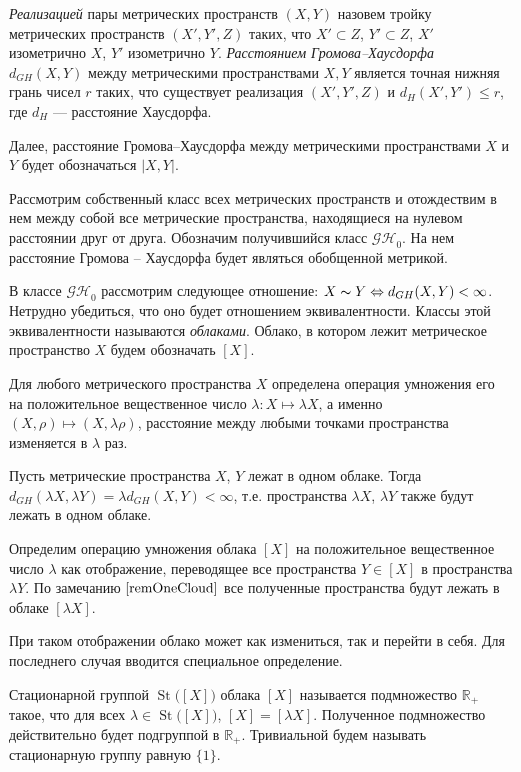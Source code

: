 \documentclass[11pt,twoside,draft
]{article}
\DeclareMathOperator{\St}{St}
\begin{document}
\begin{defin}
  \emph{Реализацией} пары метрических пространств $(X,Y)$ назовем тройку
  метрических пространств $(X',Y',Z)$ таких, что $X' \subset Z$, $Y' \subset Z$,
  $X'$ изометрично $X$, $Y'$ изометрично $Y$. \emph{Расстоянием
  Громова--Хаусдорфа}
  $d_{GH}(X,Y)$ между метрическими пространствами $X, Y$ является точная нижняя
  грань чисел $r$ таких, что существует реализация $(X',Y',Z)$ и $d_H(X', Y')
  \le
  r$, где $d_H$ --- расстояние Хаусдорфа.
\end{defin}
Далее, расстояние Громова--Хаусдорфа между метрическими
пространствами $X$ и $Y$ будет обозначаться $|X,Y|$.

Рассмотрим собственный класс всех метрических пространств и
отождествим в нем между собой все метрические пространства,
находящиеся на нулевом расстоянии друг от друга. Обозначим
получившийся класс $\mathcal{GH}_0$.  На нем расстояние Громова --
Хаусдорфа будет являться обобщенной метрикой.

\begin{defin} В классе $\mathcal{GH}_{0}$ рассмотрим следующее
  отношение: $X \thicksim Y \Leftrightarrow d_{GH}(X, Y) < \infty$. Нетрудно
  убедиться, что оно будет отношением эквивалентности. Классы этой
  эквивалентности
  называются \emph{облаками}. Облако, в котором лежит метрическое
  пространство $X$
  будем обозначать $[X]$.
\end{defin}

Для любого метрического пространства $X$ определена операция умножения его
на положительное вещественное число $\lambda\colon X\mapsto \lambda X$, а именно
$(X, \rho) \mapsto (X, \lambda \rho)$, расстояние между любыми точками
пространства изменяется в $\lambda$ раз.
\begin{remark} Пусть метрические
  пространства $X$, $Y$ лежат в одном облаке. Тогда
  $d_{GH}(\lambda X, \lambda Y) = \lambda d_{GH}(X,Y) < \infty$, т.е.
  пространства
  $\lambda X$, $\lambda Y$ также будут лежать в одном облаке.
  \label{remOneCloud}
\end{remark}
\begin{defin}Определим операцию умножения облака $[X]$ на
  положительное вещественное
  число $\lambda$ как отображение, переводящее все пространства $Y \in [X]$ в
  пространства $\lambda Y$. По замечанию $\ref{remOneCloud}$ все
  полученные пространства будут
  лежать в облаке $[\lambda X]$.
\end{defin}
При таком отображении облако может как
измениться, так и перейти в себя. Для последнего случая вводится специальное
определение.
\begin{defin}
  Стационарной группой $\St\bigl([X]\bigr)$ облака $[X]$
  называется подмножество $\mathbb{R}_+$ такое, что для всех
  $\lambda \in \St\bigl([X]\bigr)$, $[X] = [\lambda X]$. Полученное подмножество
  действительно будет подгруппой в $\mathbb{R}_+$. Тривиальной
  будем называть стационарную группу равную $\{1\}$.
\end{defin}
\end{document}
